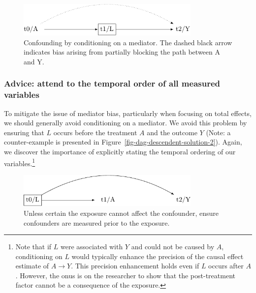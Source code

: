 \documentclass[
  singlecolumn]{article}
\begin{document}
\begin{figure}

{\centering \includegraphics[width=0.8\textwidth,height=\textheight]{causal-dags_files/figure-pdf/fig-dag-mediator-1.pdf}

}

\caption{\label{fig-dag-mediator}Confounding by conditioning on a
mediator. The dashed black arrow indicates bias arising from partially
blocking the path between A and Y.}

\end{figure}

\hypertarget{advice-attend-to-the-temporal-order-of-all-measured-variables-2}{%
\subsubsection{Advice: attend to the temporal order of all measured
variables}\label{advice-attend-to-the-temporal-order-of-all-measured-variables-2}}

To mitigate the issue of mediator bias, particularly when focusing on
total effects, we should generally avoid conditioning on a mediator. We
avoid this problem by ensuring that \(L\) occurs before the treatment
\(A\) and the outcome \(Y\) (Note: a counter-example is presented in
Figure~\ref{fig-dag-descendent-solution-2}). Again, we discover the
importance of explicitly stating the temporal ordering of our
variables.\footnote{Note that if \(L\) were associated with \(Y\) and
  could not be caused by \(A\), conditioning on \(L\) would typically
  enhance the precision of the causal effect estimate of \(A \to Y\).
  This precision enhancement holds even if \(L\) occurs after \(A\).
  However, the onus is on the researcher to show that the post-treatment
  factor cannot be a consequence of the exposure.}

\begin{figure}

{\centering \includegraphics[width=0.8\textwidth,height=\textheight]{causal-dags_files/figure-pdf/fig-dag-mediator-solution-1.pdf}

}

\caption{\label{fig-dag-mediator-solution}Unless certain the exposure
cannot affect the confounder, ensure confounders are measured prior to
the exposure.}

\end{figure}
\end{document}
